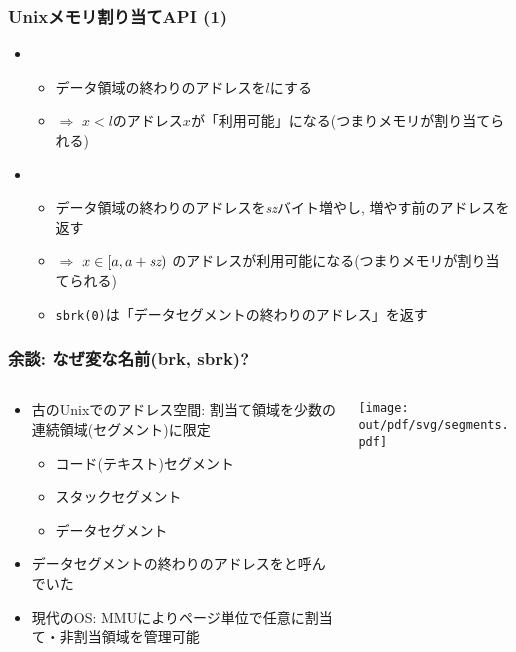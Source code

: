 \documentclass[12pt,dvipdfmx]{beamer}
\begin{document}
\begin{frame}
  \frametitle{Unixメモリ割り当てAPI (1)}
  \begin{itemize}
  \item {}
    \begin{itemize}
    \item データ領域の終わりのアドレスを$l$にする
    \item $\Rightarrow$ $x < l$のアドレス$x$が「利用可能」になる(つまりメモリが割り当てられる)
    \end{itemize}
  \item {}
    \begin{itemize}
    \item データ領域の終わりのアドレスを{\it sz}バイト増やし,
      増やす前のアドレスを返す
    \item $\Rightarrow$ $x \in [a, a+\mbox{\it sz})$
      のアドレスが利用可能になる(つまりメモリが割り当てられる)
    \item {\tt sbrk(0)}は「データセグメントの終わりのアドレス」を返す
    \end{itemize}
  \end{itemize}
\end{frame}

\begin{frame}
  \frametitle{余談: なぜ変な名前(brk, sbrk)?}
  \begin{columns}
    \begin{column}{0.6\textwidth}
      \begin{itemize}
      \item 古のUnixでのアドレス空間: 割当て領域を少数の連続領域(セグメント)に限定
        \begin{itemize}
        \item コード(テキスト)セグメント
        \item スタックセグメント
        \item データセグメント
        \end{itemize}
      \item データセグメントの終わりのアドレスをと呼んでいた
      \item 現代のOS:
        MMUによりページ単位で任意に割当て・非割当領域を管理可能
      \end{itemize}
    \end{column}
    \begin{column}{0.4\textwidth}
      \texttt{[image: out/pdf/svg/segments.pdf]}
    \end{column}
  \end{columns}

\end{frame}
\end{document}
